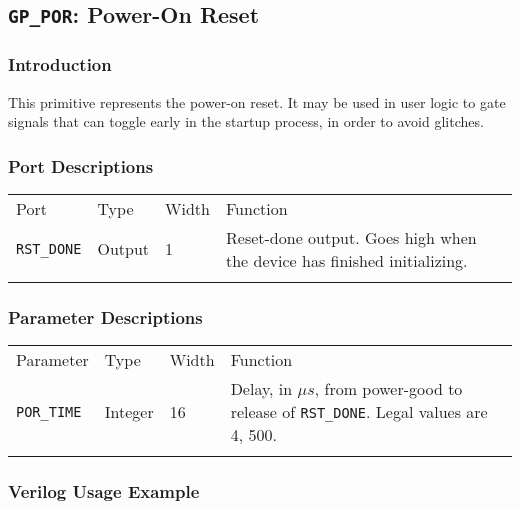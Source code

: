 \documentclass[11pt]{article}
\newcommand{\tokenstyle}[1]{\texttt{#1}}
\newcommand{\whenstyle}[1]{{\fontseries{sb}\selectfont#1}}
\newcommand{\thinhline}{\Xhline{1\arrayrulewidth}}
\newcommand{\thickhline}{\Xhline{2.5\arrayrulewidth}}
\begin{document}

\pagebreak
\clearpage
\subsection{\tokenstyle{GP\_POR}: Power-On Reset}
\label{gp-por}

\subsubsection{Introduction}
This primitive represents the power-on reset. It may be used in user logic to gate signals that can toggle early in the
startup process, in order to avoid glitches.


\subsubsection{Port Descriptions}

\begin{tabularx}{\textwidth}{lllX}
\thinhline
\whenstyle{Port} & \whenstyle{Type} & \whenstyle{Width} & \whenstyle{Function} \\
\thickhline
\tokenstyle{RST\_DONE} & Output & 1 & Reset-done output. Goes high when the device has finished initializing.\\
\thinhline
\end{tabularx}

\subsubsection{Parameter Descriptions}

\begin{tabularx}{\textwidth}{lllX}
\thinhline
\whenstyle{Parameter} & \whenstyle{Type} & \whenstyle{Width} & \whenstyle{Function} \\
\thickhline
\tokenstyle{POR\_TIME} & Integer & 16 & Delay, in $\mu s$, from power-good to release of \tokenstyle{RST\_DONE}. Legal values are 4, 500.\\
\thinhline
\end{tabularx}

\subsubsection{Verilog Usage Example}
\end{document}
